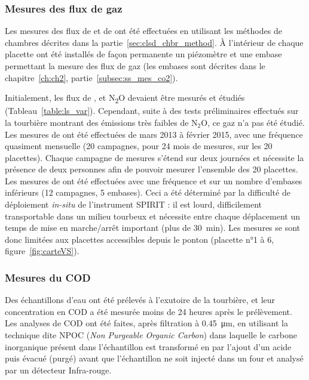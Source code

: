 \subsubsection{Mesures des flux de gaz}

Les mesures des flux de \coo et de \chh ont été effectuées en utilisant les méthodes de chambres décrites dans la partie~\ref{sec:clsd_chbr_method}.
À l'intérieur de chaque placette ont été installés de façon permanente un piézomètre et une embase permettant la mesure des flux de gaz (les embases sont décrites dans le chapitre~\ref{ch:ch2}, partie~\ref{subsec:ss_mes_co2}).


Initialement, les flux de \coo, \chh et N\textsubscript{2}O devaient être mesurés et étudiés (Tableau~\ref{table:ls_var}).
Cependant, suite à des tests préliminaires effectués sur la tourbière montrant des émissions très faibles de N$_{2}$O, ce gaz n'a pas été étudié.
Les mesures de \coo ont été effectuées de mars 2013 à février 2015, avec une fréquence quasiment mensuelle (20 campagnes, pour 24 mois de mesures, sur les 20 placettes). 
Chaque campagne de mesures s'étend sur deux journées et nécessite la présence de deux personnes afin de pouvoir mesurer l'ensemble des 20 placettes.
Les mesures de \chh ont été effectuées avec une fréquence et sur un nombre d'embases inférieurs (12 campagnes, 5 embases).
Ceci a été déterminé par la difficulté de déploiement \textit{in-situ} de l'instrument SPIRIT : il est lourd, difficilement transportable dans un milieu tourbeux et nécessite entre chaque déplacement un temps de mise en marche/arrêt important (plus de \SI{30}{\minute}).
Les mesures se sont donc limitées aux placettes accessibles depuis le ponton (placette n°1 à 6, figure~\ref{fig:carteVS}).


\subsubsection{Mesures du COD}

Des échantillons d'eau ont été prélevés à l'exutoire de la tourbière, et leur concentration en COD a été mesurée moins de 24 heures après le prélèvement.
Les analyses de COD ont été faites, après filtration à \SI{0.45}{\micro\metre}, en utilisant la technique dite NPOC (\textit{Non Purgeable Organic Carbon}) dans laquelle le carbone inorganique présent dans l'échantillon est transformé en \coo par l'ajout d'un acide puis évacué (purgé) avant que l'échantillon ne soit injecté dans un four et analysé par un détecteur Infra-rouge.

